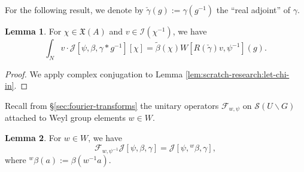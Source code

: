 \documentclass[reqno]{amsart}
\theoremstyle{plain} \newtheorem{theorem} {Theorem}
\theoremstyle{definition} \newtheorem{definition} [theorem] {Definition}
\theoremstyle{itplain} %
\newtheorem{lemma}[theorem]{Lemma}
\numberwithin{equation}{section}
\numberwithin{theorem}{section}
\begin{document}
For the following result, we denote by $\check{\gamma}(g) := \gamma(g^{-1})$ the ``real adjoint'' of $\gamma$.
\begin{lemma}\label{lem:standard:chi-in-mathfrakxa}
  For $\chi \in \mathfrak{X}(A)$ and $v \in \mathcal{I}(\chi^{-1})$, we have
  \begin{equation}\label{eq:mathc-beta-gamm-1}
    \int _{N}
    v \cdot 
    \mathcal{J}[\psi,\beta,\gamma \ast g^{-1}][\chi]
    =
    \tilde{\beta}(\chi)
    W[R(\check{\gamma}) v, \psi^{-1}](g).
\end{equation}
\end{lemma}
\begin{proof}
  We apply complex conjugation to Lemma \ref{lem:scratch-research:let-chi-in}.
\end{proof}

Recall from \S\ref{sec:fourier-transforms} the unitary operators $\mathcal{F}_{w,\psi}$ on $\mathcal{S}(U \backslash G)$ attached to Weyl group elements $w \in W$.
\begin{lemma}\label{lem:sub-gln:each-psi-beta-1}
  For $w \in W$, we have
  \begin{equation*}
    \mathcal{F}_{w,\psi^{-1}} \mathcal{J}[\psi,\beta,\gamma] = \mathcal{J}[{\psi,{}^w \beta,\gamma}],
  \end{equation*}
  where ${}^w \beta(a) := \beta(w^{-1} a)$.
\end{lemma}
\end{document}
